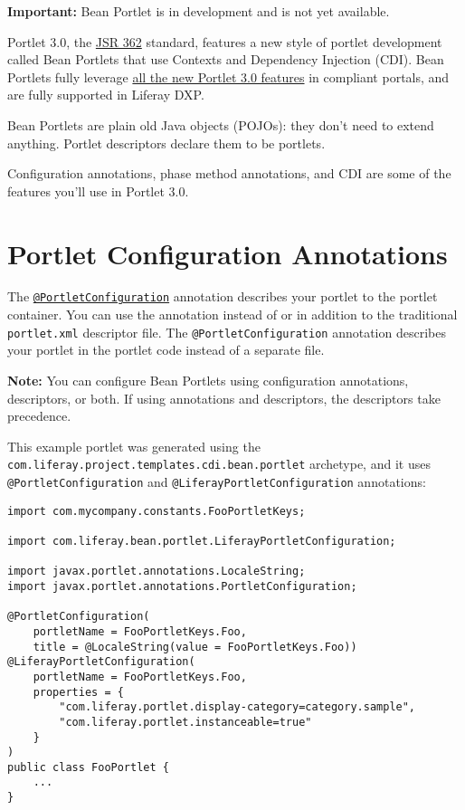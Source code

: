 \noindent\hrulefill

\textbf{Important:} Bean Portlet is in development and is not yet
available.

\noindent\hrulefill

Portlet 3.0, the \href{https://jcp.org/en/jsr/detail?id=362}{JSR 362}
standard, features a new style of portlet development called Bean
Portlets that use Contexts and Dependency Injection (CDI). Bean Portlets
fully leverage
\href{https://portals.apache.org/pluto/v301/v3Features.html}{all the new
Portlet 3.0 features} in compliant portals, and are fully supported in
Liferay DXP.

Bean Portlets are plain old Java objects (POJOs): they don't need to
extend anything. Portlet descriptors declare them to be portlets.

Configuration annotations, phase method annotations, and CDI are some of
the features you'll use in Portlet 3.0.

\section{Portlet Configuration
Annotations}\label{portlet-configuration-annotations}

The
\href{https://docs.liferay.com/portlet-api/3.0/javadocs/javax/portlet/annotations/PortletConfiguration.html}{\texttt{@PortletConfiguration}}
annotation describes your portlet to the portlet container. You can use
the annotation instead of or in addition to the traditional
\texttt{portlet.xml} descriptor file. The \texttt{@PortletConfiguration}
annotation describes your portlet in the portlet code instead of a
separate file.

\noindent\hrulefill

\textbf{Note:} You can configure Bean Portlets using configuration
annotations, descriptors, or both. If using annotations and descriptors,
the descriptors take precedence.

\noindent\hrulefill

This example portlet was generated using the
\texttt{com.liferay.project.templates.cdi.bean.portlet} archetype, and
it uses \texttt{@PortletConfiguration} and
\texttt{@LiferayPortletConfiguration} annotations:

\begin{verbatim}
import com.mycompany.constants.FooPortletKeys;

import com.liferay.bean.portlet.LiferayPortletConfiguration;

import javax.portlet.annotations.LocaleString;
import javax.portlet.annotations.PortletConfiguration;

@PortletConfiguration(
    portletName = FooPortletKeys.Foo,
    title = @LocaleString(value = FooPortletKeys.Foo))
@LiferayPortletConfiguration(
    portletName = FooPortletKeys.Foo,
    properties = {
        "com.liferay.portlet.display-category=category.sample",
        "com.liferay.portlet.instanceable=true"
    }
)
public class FooPortlet {
    ...
}
\end{verbatim}

